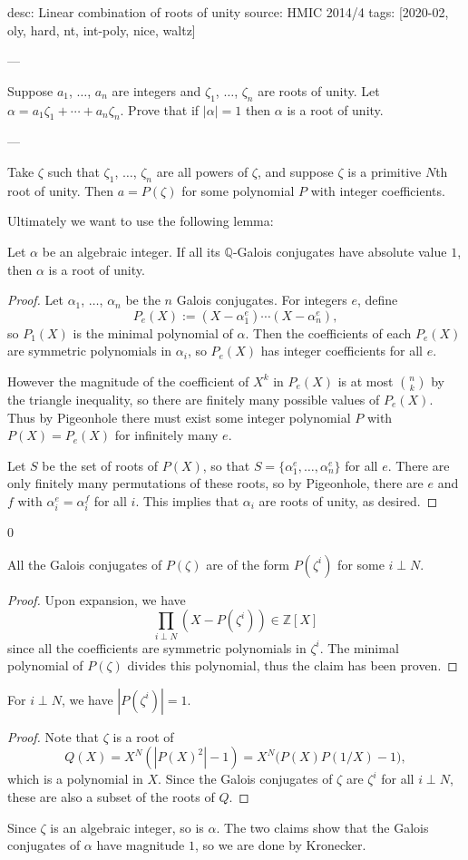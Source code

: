 desc: Linear combination of roots of unity
source: HMIC 2014/4
tags: [2020-02, oly, hard, nt, int-poly, nice, waltz]

---

Suppose $a_1$, $\ldots$, $a_n$ are integers and $\zeta_1$, $\ldots$, $\zeta_n$ are roots of unity. Let $\alpha=a_1\zeta_1+\cdots+a_n\zeta_n$. Prove that if $|\alpha|=1$ then $\alpha$ is a root of unity.

---

Take $\zeta$ such that $\zeta_1$, $\ldots$, $\zeta_n$ are all powers of $\zeta$, and suppose $\zeta$ is a primitive $N$th root of unity. Then $a=P(\zeta)$ for some polynomial $P$ with integer coefficients.

Ultimately we want to use the following lemma:
\begin{lemma*}[Kronecker]
    Let $\alpha$ be an algebraic integer. If all its $\mathbb Q$-Galois conjugates have absolute value $1$, then $\alpha$ is a root of unity.
\end{lemma*}
\begin{proof}
    Let $\alpha_1$, $\ldots$, $\alpha_n$ be the $n$ Galois conjugates. For integers $e$, define \[P_e(X):=(X-\alpha_1^e)\cdots(X-\alpha_n^e),\]
    so $P_1(X)$ is the minimal polynomial of $\alpha$. Then the coefficients of each $P_e(X)$ are symmetric polynomials in $\alpha_i$, so $P_e(X)$ has integer coefficients for all $e$.

    However the magnitude of the coefficient of $X^k$ in $P_e(X)$ is at most $\binom nk$ by the triangle inequality, so there are finitely many possible values of $P_e(X)$. Thus by Pigeonhole there must exist some integer polynomial $P$ with $P(X)=P_e(X)$ for infinitely many $e$.

    Let $S$ be the set of roots of $P(X)$, so that $S=\{\alpha_1^e,\ldots,\alpha_n^e\}$ for all $e$. There are only finitely many permutations of these roots, so by Pigeonhole, there are $e$ and $f$ with $\alpha_i^e=\alpha_i^f$ for all $i$. This implies that $\alpha_i$ are roots of unity, as desired.
\end{proof}
\setcounter{claim}0
\begin{claim}
    All the Galois conjugates of $P(\zeta)$ are of the form $P(\zeta^i)$ for some $i\perp N$.
\end{claim}
\begin{proof}
    Upon expansion, we have \[\prod_{i\perp N}\left(X-P(\zeta^i)\right)\in\mathbb Z[X]\]
    since all the coefficients are symmetric polynomials in $\zeta^i$. The minimal polynomial of $P(\zeta)$ divides this polynomial, thus the claim has been proven.
\end{proof}
\begin{claim}
    For $i\perp N$, we have $|P(\zeta^i)|=1$.
\end{claim}
\begin{proof}
    Note that $\zeta$ is a root of \[Q(X)=X^N\left(|P(X)^2|-1\right)=X^N\big(P(X)P(1/X)-1\big),\]
    which is a polynomial in $X$. Since the Galois conjugates of $\zeta$ are $\zeta^i$ for all $i\perp N$, these are also a subset of the roots of $Q$.
\end{proof}

Since $\zeta$ is an algebraic integer, so is $\alpha$. The two claims show that the Galois conjugates of $\alpha$ have magnitude $1$, so we are done by Kronecker.
